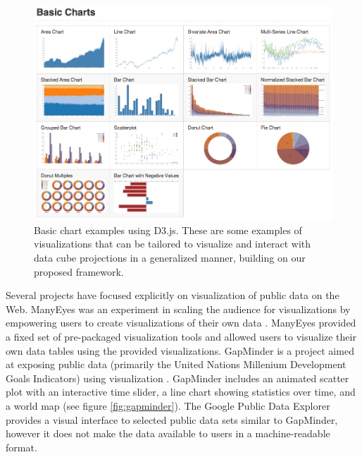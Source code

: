 \documentclass[12pt]{article}
\begin{document}
\begin{doublespace}
\begin{figure}[h!]
  \centering
  \includegraphics[width=\textwidth]{figures/d3BasicCharts.png}
  \caption[D3.js basic charts.]
    {Basic chart examples using D3.js. These are some examples of visualizations that can be tailored to visualize and interact with data cube projections in a generalized manner, building on our proposed framework.}
  \label{fig:d3basic}
\end{figure}

Several projects have focused explicitly on visualization of public data on the Web. ManyEyes was an experiment in scaling the audience for visualizations by empowering users to create visualizations of their own data \cite{viegas2007manyeyes}. ManyEyes provided a fixed set of pre-packaged visualization tools and allowed users to visualize their own data tables using the provided visualizations. GapMinder is a project aimed at exposing public data (primarily the United Nations Millenium Development Goals Indicators) using visualization \cite{rosling2005new}. GapMinder includes an animated scatter plot with an interactive time slider, a line chart showing statistics over time, and a world map (see figure \ref{fig:gapminder}). The Google Public Data Explorer provides a visual interface to selected public data sets similar to GapMinder, however it does not make the data available to users in a machine-readable format.


\end{doublespace}
\end{document}
